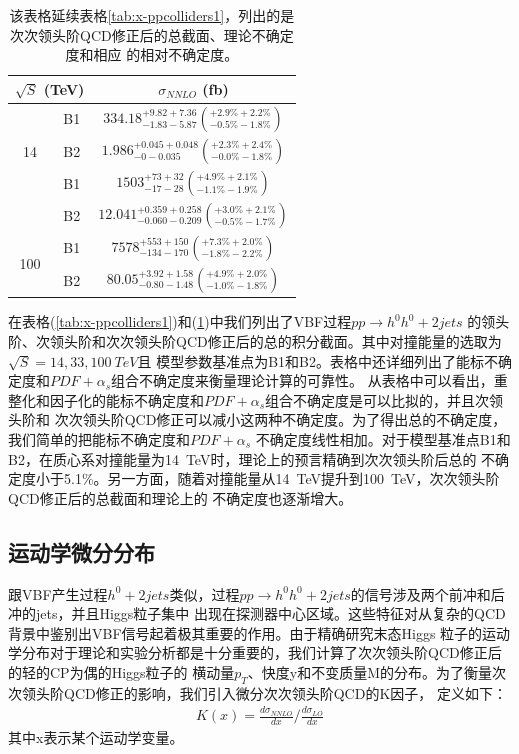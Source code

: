 \begin{table}
  \centering 
  \begin{tabular}{|c|c|c|}
  \hline\hline
  \multicolumn{2}{|c|}{$\sqrt{S}$ (TeV)} & $\sigma_{NNLO}$ (fb) \\
  \hline
  \multirow{3}{*}{14}  & B1 &
   $334.18^{+9.82 +7.36}_{-1.83-5.87} \left( ^{+ 2.9 \% + 2.2 \%}_{-0.5 \% - 1.8 \%} \right)$ \\
   & B2 &
   $1.986^{+0.045 +0.048}_{-0-0.035} \left( ^{+ 2.3 \% + 2.4 \%}_{-0.0 \% - 1.8 \%} \right)$ \\
   \hline
   \multirow{3}{*}{33}  & B1 &
   $1503^{+73 +32}_{-17-28} \left( ^{+ 4.9 \% + 2.1 \%}_{-1.1 \% - 1.9 \%} \right)$ \\
   & B2 &
   $12.041^{+0.359 +0.258}_{-0.060-0.209} \left( ^{+ 3.0 \% + 2.1 \%}_{-0.5 \% - 1.7 \%} \right)$ \\
   \hline
   \multirow{3}{*}{100}  & B1 &
   $7578^{+553 +150}_{-134-170} \left( ^{+ 7.3 \% + 2.0 \%}_{-1.8 \% - 2.2 \%} \right)$ \\
   & B2 &
   $80.05^{+3.92 +1.58}_{-0.80-1.48} \left( ^{+ 4.9 \% + 2.0 \%}_{-1.0 \% - 1.8 \%} \right)$ \\
   \hline \hline
  \end{tabular}
\caption{该表格延续表格\ref{tab:x-ppcolliders1}，列出的是次次领头阶QCD修正后的总截面、理论不确定度和相应
的相对不确定度。}
\label{tab:x-ppcolliders2}
\end{table}
在表格(\ref{tab:x-ppcolliders1})和(\ref{tab:x-ppcolliders2})中我们列出了VBF过程$pp\to h^0h^0+2jets$
的领头阶、次领头阶和次次领头阶QCD修正后的总的积分截面。其中对撞能量的选取为$\sqrt{S} = 14,33,100~TeV$且
模型参数基准点为B1和B2。表格中还详细列出了能标不确定度和$PDF+\alpha_s$组合不确定度来衡量理论计算的可靠性。
从表格中可以看出，重整化和因子化的能标不确定度和$PDF+\alpha_s$组合不确定度是可以比拟的，并且次领头阶和
次次领头阶QCD修正可以减小这两种不确定度。为了得出总的不确定度，我们简单的把能标不确定度和$PDF+\alpha_s$
不确定度线性相加。对于模型基准点B1和B2，在质心系对撞能量为14~TeV时，理论上的预言精确到次次领头阶后总的
不确定度小于5.1\%。另一方面，随着对撞能量从14~TeV提升到100~TeV，次次领头阶QCD修正后的总截面和理论上的
不确定度也逐渐增大。

\subsection{运动学微分分布}
跟VBF产生过程$h^0+2jets$类似，过程$pp\to h^0h^0+2jets$的信号涉及两个前冲和后冲的jets，并且Higgs粒子集中
出现在探测器中心区域。这些特征对从复杂的QCD背景中鉴别出VBF信号起着极其重要的作用。由于精确研究末态Higgs
粒子的运动学分布对于理论和实验分析都是十分重要的，我们计算了次次领头阶QCD修正后的轻的CP为偶的Higgs粒子的
横动量$p_T$、快度y和不变质量M的分布。为了衡量次次领头阶QCD修正的影响，我们引入微分次次领头阶QCD的K因子，
定义如下：
\begin{eqnarray}
K(x) = \frac{d \sigma_{NNLO}}{dx}\Big/\frac{d \sigma_{LO}}{dx}
\end{eqnarray}
其中x表示某个运动学变量。

